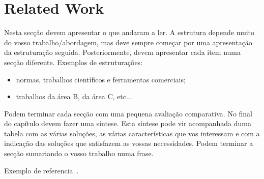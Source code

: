 \chapter{Related Work}
\label{chapter:relatedwork}

Nesta secção devem apresentar o que andaram a ler. A estrutura depende muito do
vosso trabalho/abordagem, mas deve sempre começar por uma apresentação da
estruturação seguida. Posteriormente, devem apresentar cada item numa secção
diferente. Exemplos de estruturações:
\begin{itemize}
\item normas, trabalhos científicos e ferramentas comerciais;
\item trabalhos da área B, da área C, etc...
\end{itemize}
Podem terminar cada secção com uma pequena avaliação comparativa.
No final do capítulo devem fazer uma síntese. Esta síntese pode vir acompanhada
duma tabela com as várias soluções, as várias características que vos interessam
e com a indicação das soluções que satisfazem as vossas necessidades. Podem
terminar a secção sumariando o vosso trabalho numa frase.

Exemplo de referencia~\cite{Biagioni2011}.

